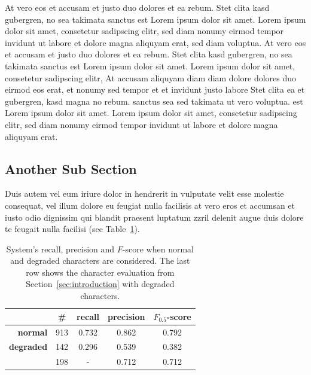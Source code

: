 At vero eos et accusam et justo duo dolores et ea rebum. Stet clita kasd gubergren, no sea takimata sanctus est Lorem ipsum dolor sit amet. Lorem ipsum dolor sit amet, consetetur sadipscing elitr, sed diam nonumy eirmod tempor invidunt ut labore et dolore magna aliquyam erat, sed diam voluptua. At vero eos et accusam et justo duo dolores et ea rebum. Stet clita kasd gubergren, no sea takimata sanctus est Lorem ipsum dolor sit amet. Lorem ipsum dolor sit amet, consetetur sadipscing elitr, At accusam aliquyam diam diam dolore dolores duo eirmod eos erat, et nonumy sed tempor et et invidunt justo labore Stet clita ea et gubergren, kasd magna no rebum. sanctus sea sed takimata ut vero voluptua. est Lorem ipsum dolor sit amet. Lorem ipsum dolor sit amet, consetetur sadipscing elitr, sed diam nonumy eirmod tempor invidunt ut labore et dolore magna aliquyam erat.

\subsection{Another Sub Section}
\label{sec:subSection2}
Duis autem vel eum iriure dolor in hendrerit in vulputate velit esse molestie consequat, vel illum dolore eu feugiat nulla facilisis at vero eros et accumsan et iusto odio dignissim qui blandit praesent luptatum zzril delenit augue duis dolore te feugait nulla facilisi (see Table~\ref{tab:performance}).

\begin{table}[ht]
\centering
		\begin{tabular}{r | c c c c}
													& \#	& \textbf{recall} 	& \textbf{precision} 	&  $F_{0.5}$-score \\ 
		\hline
			\textbf{normal} 		& 913	&	0.732	& 0.862	&	0.792	\\
			\textbf{degraded}		& 142	& 0.296	& 0.539	& 0.382	\\
			\setB								& 198	& -			& 0.712	& 0.712	\\
		\end{tabular}
		\caption{System's recall, precision and $F$-score when normal and degraded characters are considered. The last row shows the character evaluation from Section~\ref{sec:introduction} with degraded characters.}
	\label{tab:performance}
\end{table}

